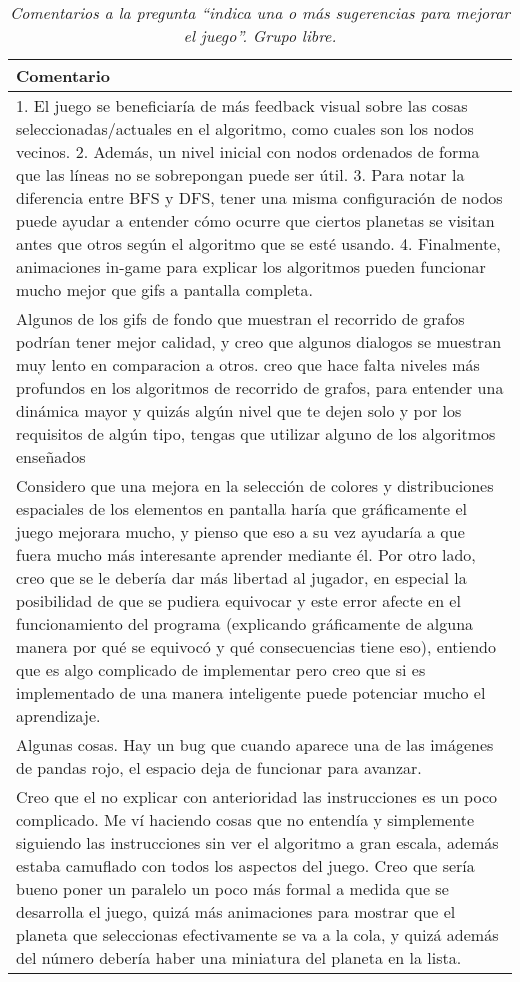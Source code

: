 \begin{table}[h]
   \centering
   \caption*{\textit{Comentarios a la pregunta ``indica una o más sugerencias para mejorar el juego''. Grupo libre.}}
   \begin{tabular}{|p{\linewidth}|}
   \hline %
   \textbf{Comentario} \\\hline
   1. El juego se beneficiaría de más feedback visual sobre las cosas seleccionadas/actuales en el algoritmo, como cuales son los nodos vecinos.
   2. Además, un nivel inicial con nodos ordenados de forma que las líneas no se sobrepongan puede ser útil.
   3. Para notar la diferencia entre BFS y DFS, tener una misma configuración de nodos puede ayudar a entender cómo ocurre que ciertos planetas se visitan antes que otros según el algoritmo que se esté usando.
   4. Finalmente, animaciones in-game para explicar los algoritmos pueden funcionar mucho mejor que gifs a pantalla completa. \\\hline


   Algunos de los gifs de fondo que muestran el recorrido de grafos podrían tener mejor calidad, y creo que algunos dialogos se muestran muy lento en comparacion a otros.
   creo que hace falta niveles más profundos en los algoritmos de recorrido de grafos, para entender una dinámica mayor y quizás algún nivel que te dejen solo y por los requisitos de algún tipo, tengas que utilizar alguno de los algoritmos enseñados\\\hline

   Considero que una mejora en la selección de colores y distribuciones espaciales de los elementos en pantalla haría que gráficamente el juego mejorara mucho, y pienso que eso a su vez ayudaría a que fuera mucho más interesante aprender mediante él. Por otro lado, creo que se le debería dar más libertad al jugador, en especial la posibilidad de que se pudiera equivocar y este error afecte en el funcionamiento del programa (explicando gráficamente de alguna manera por qué se equivocó y qué consecuencias tiene eso), entiendo que es algo complicado de implementar pero creo que si es implementado de una manera inteligente puede potenciar mucho el aprendizaje.\\\hline

   Algunas cosas. Hay un bug que cuando aparece una de las imágenes de pandas rojo, el espacio deja de funcionar para avanzar. \\\hline 
   
   Creo que el no explicar con anterioridad las instrucciones es un poco complicado. Me ví haciendo cosas que no entendía y simplemente siguiendo las instrucciones sin ver el algoritmo a gran escala, además estaba camuflado con todos los aspectos del juego. Creo que sería bueno poner un paralelo un poco más formal a medida que se desarrolla el juego, quizá más animaciones para mostrar que el planeta que seleccionas efectivamente se va a la cola, y quizá además del número debería haber una miniatura del planeta en la lista.  \\\hline
   

\end{tabular}
\end{table}
